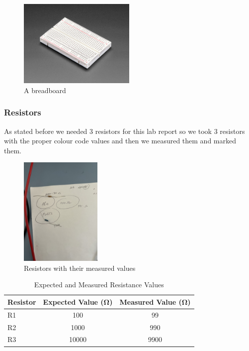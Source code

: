 \documentclass[a4paper, 10pt]{article}
\begin{document}
				\begin{figure}[h!]
					\centering
					\includegraphics[width=0.5\textwidth]{images/breadboard.jpeg}
					\caption{A breadboard}
					\label{fig:breadboard}
				\end{figure}
			

			\pagebreak

			\subsubsection{Resistors}
				As stated before we needed 3 resistors for this lab report so we took 3 resistors with the proper colour code values and then we measured them and marked them.

				\begin{figure}[h!]
					\centering
					\includegraphics[width=0.35\textwidth]{images/Resistors.jpeg}
					\caption{Resistors with their measured values}
					\label{fig:resistors}
				\end{figure}

	
				\begin{table}[h!]
					\centering
					\begin{tabular}{@{}l|S|S@{}} %
						\toprule
						{Resistor} & {Expected Value (\si{\ohm})} & {Measured Value (\si{\ohm})} \\
						\midrule
						R1 & 100 & 99 \\
						R2 & 1000 & 990 \\
						R3 & 10000 & 9900 \\
						\bottomrule
					\end{tabular}
					\caption{Expected and Measured Resistance Values}
					\label{tab:resistors}
				\end{table}
\end{document}
